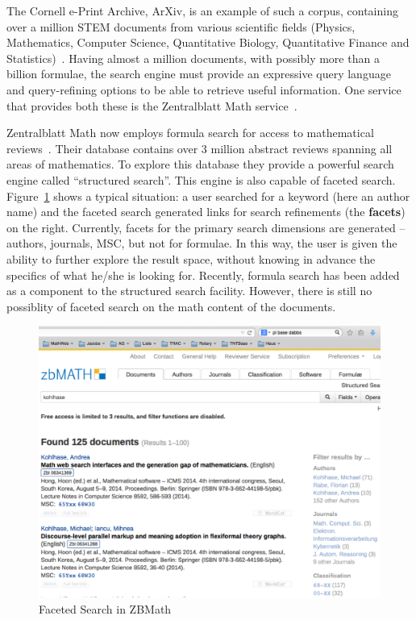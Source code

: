 \documentclass[a4paper,11pt,oneside]{article}
\def\arxiv{\textsf{ArXiv}\xspace}
\begin{document}
The Cornell e-Print Archive, \arxiv, is an example of such a corpus, containing
over a million STEM documents from various scientific fields (Physics,
Mathematics, Computer Science, Quantitative Biology, Quantitative Finance and
Statistics)~\cite{arXiv:online}. Having almost a million documents, with
possibly more than a billion formulae, the search engine must provide an
expressive query language and query-refining options to be able to retrieve
useful information. One service that provides both these is the Zentralblatt
Math service~\cite{zbmath:online}.

Zentralblatt Math now employs formula search for access to mathematical
reviews~\cite{KohMihSperTes:mfs13}. Their database contains over 3 million
abstract reviews spanning all areas of mathematics. To explore this database
they provide a powerful search engine called ``structured search''. This engine
is also capable of faceted search.  Figure~\ref{fig:zbFaceted} shows a typical
situation: a user searched for a keyword (here an author name) and the faceted
search generated links for search refinements (the \textbf{facets}) on the
right. Currently, facets for the primary search dimensions are generated --
authors, journals, MSC, but not for formulae. In this way, the user is given
the ability to further explore the result space, without knowing in advance the
specifics of what he/she is looking for.  Recently, formula search has been
added as a component to the structured search facility. However, there is still
no possiblity of faceted search on the math content of the documents.

\begin{figure}[ht]\centering
\includegraphics[width=12.7cm]{img/faceted-search.pdf}
\caption{Faceted Search in ZBMath}\label{fig:zbFaceted}
\end{figure}
\end{document}
